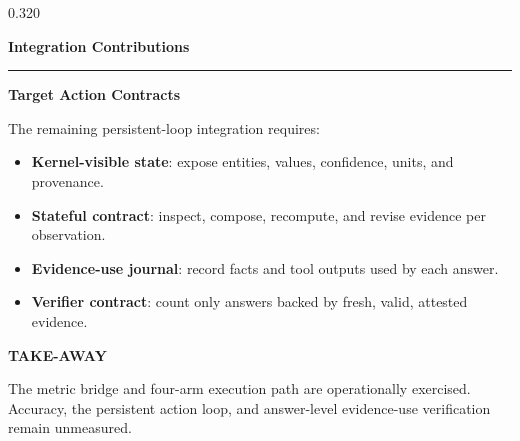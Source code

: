 \documentclass{beamer}
\newenvironment{possection}[2]{%
  \par\vspace{0.10cm}%
  \noindent{\color{ncgreendark}\bfseries\large #1}\hspace{0.42em}%
  {\color{ncink}\bfseries\large #2}\par\vspace{-0.20cm}%
  \noindent\textcolor{ncline}{\rule{\linewidth}{0.9pt}}\par\vspace{0cm}%
  \begin{minipage}{\linewidth}%
}{%
  \end{minipage}\par\vspace{0.40cm}%
}
\newcommand{\possub}[2]{%
  \par\vspace{0.02cm}%
  \noindent{\color{ncgreendark}\bfseries #1}\hspace{0.38em}%
  {\color{ncink}\bfseries #2}\par\vspace{0.07cm}%
}
\begin{document}
\begin{frame}[t]
\begin{columns}[t,onlytextwidth]
\begin{column}{0.320\textwidth}
\begin{possection}{7.}{Integration Contributions}
    \possub{7.2}{Target Action Contracts}
    The remaining persistent-loop integration requires:
    \begin{itemize}\setlength{\itemsep}{2pt}
      \item \textbf{Kernel-visible state}: expose entities, values, confidence,
            units, and provenance.
      \item \textbf{Stateful contract}: inspect, compose, recompute, and revise
            evidence per observation.
      \item \textbf{Evidence-use journal}: record facts and tool outputs used
            by each answer.
      \item \textbf{Verifier contract}: count only answers backed by fresh,
            valid, attested evidence.
    \end{itemize}
    \par\vspace{-0.05cm}
    \begin{takeaway}
      {\ttfamily\footnotesize\bfseries\color{ncgreendark}\MakeUppercase{Take-away}}\par
      \vspace{0.12cm}
      {\color{ncink}\normalsize The metric bridge and four-arm execution path
      are operationally exercised. Accuracy, the persistent action loop, and
      answer-level evidence-use verification remain unmeasured.}
    \end{takeaway}
  \end{possection}

  \vspace{-0.40cm}

\end{column}

\end{columns}
\end{frame}
\end{document}
